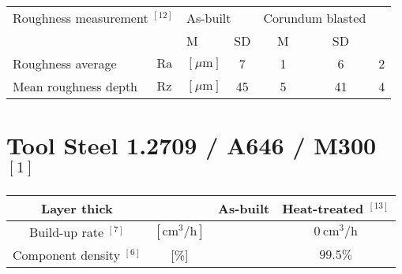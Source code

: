 \documentclass[10pt]{article}
\begin{document}
\begin{center}
\begin{tabular}{|l|ll|c|c|c|c|}
\hline
\multicolumn{2}{|l|}{Roughness measurement ${ }^{[12]}$} & \multicolumn{2}{l|}{As-built} & \multicolumn{2}{c|}{Corundum blasted} &  \\
\cline { 4 - 7 }
\multicolumn{2}{|c|}{} & M & SD & M & SD &  \\
\hline
Roughness average & $\mathrm{Ra}$ & $[\mu \mathrm{m}]$ & 7 & 1 & 6 & 2 \\
\hline
Mean roughness depth & $\mathrm{Rz}$ & $[\mu \mathrm{m}]$ & 45 & 5 & 41 & 4 \\
\hline
\end{tabular}
\end{center}

\section*{Tool Steel 1.2709 / A646 / M300 ${ }^{[1]}$}
\begin{center}
\begin{tabular}{|c|c|c|c|}
\hline
Layer thick &  & As-built & Heat-treated ${ }^{[13]}$ \\
\hline
Build-up rate ${ }^{[7]}$ & $\left[\mathrm{cm}^{3} / \mathrm{h}\right]$ &  & $0 \mathrm{~cm}^{3} / \mathrm{h}$ \\
\hline
Component density ${ }^{[6]}$ & [\%] &  & $99.5 \%$ \\
\hline
\end{tabular}
\end{center}
\end{document}
